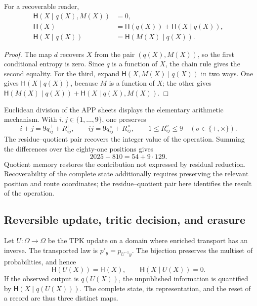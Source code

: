 \begin{proposition}
For a recoverable reader,
\begin{align}
 \mathsf H(X\mid q(X),M(X))&=0,\\
 \mathsf H(X)&=\mathsf H(q(X))+\mathsf H(X\mid q(X)),\\
 \mathsf H(X\mid q(X))&=\mathsf H(M(X)\mid q(X)).
 \label{v:ant:eq:ii-kb-aut-fibra}
\end{align}
\end{proposition}
\begin{proof}
The map \(d\) recovers \(X\) from the pair \((q(X),M(X))\),
so the first conditional entropy is zero. Since \(q\) is
a function of \(X\), the chain rule gives the second equality.
For the third, expand
\(\mathsf H(X,M(X)\mid q(X))\) in two ways. One gives
\(\mathsf H(X\mid q(X))\), because \(M\) is a function of \(X\);
the other gives
\(\mathsf H(M(X)\mid q(X))+\mathsf H(X\mid q(X),M(X))\).
\end{proof}

Euclidean division of the APP sheets displays the elementary
arithmetic mechanism. With \(i,j\in\{1,\ldots,9\}\), one preserves
\[
 i+j=9q^+_{ij}+R^+_{ij},\qquad
 ij=9q^\times_{ij}+R^\times_{ij},\qquad
 1\leq R^\sigma_{ij}\leq9\quad(\sigma\in\{+,\times\}).
\]
The residue--quotient pair recovers the integer value of the operation.
Summing the differences over the eighty-one positions gives
\[
 2025-810=54+9\cdot129.
\]
Quotient memory restores the contribution not expressed by
residual reduction. Recoverability of the complete state additionally
requires preserving the relevant position and route coordinates;
the residue--quotient pair here identifies the result of the operation.

\subsection{Reversible update, tritic decision, and erasure}

Let \(U:\Omega\to\Omega\) be the TPK update on a domain where
enriched transport has an inverse. The transported law is
\(p'_y=p_{U^{-1}y}\). The bijection preserves the multiset of
probabilities, and hence
\begin{equation}
 \mathsf H(U(X))=\mathsf H(X),\qquad
 \mathsf H(X\mid U(X))=0.
 \label{v:ant:eq:ii-kb-aut-reversible}
\end{equation}
If the observed output is \(q(U(X))\), the unpublished information
is quantified by \(\mathsf H(X\mid q(U(X)))\). The complete state,
its representation, and the reset of a record are thus three distinct maps.

